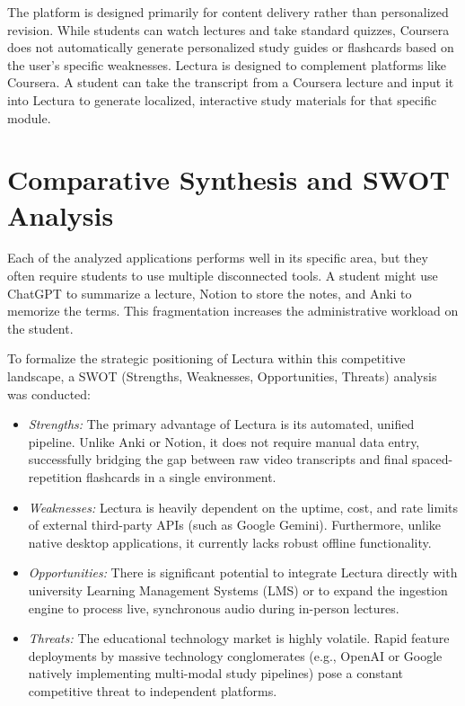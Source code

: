 The platform is designed primarily for content delivery rather than personalized revision. While students can watch lectures and take standard quizzes, Coursera does not automatically generate personalized study guides or flashcards based on the user's specific weaknesses. Lectura is designed to complement platforms like Coursera. A student can take the transcript from a Coursera lecture and input it into Lectura to generate localized, interactive study materials for that specific module.

\section{Comparative Synthesis and SWOT Analysis}
Each of the analyzed applications performs well in its specific area, but they often require students to use multiple disconnected tools. A student might use ChatGPT to summarize a lecture, Notion to store the notes, and Anki to memorize the terms. This fragmentation increases the administrative workload on the student.

To formalize the strategic positioning of Lectura within this competitive landscape, a SWOT (Strengths, Weaknesses, Opportunities, Threats) analysis was conducted:

\begin{itemize}[label=\textendash]
    \item \textit{Strengths:} The primary advantage of Lectura is its automated, unified pipeline. Unlike Anki or Notion, it does not require manual data entry, successfully bridging the gap between raw video transcripts and final spaced-repetition flashcards in a single environment.
    \item \textit{Weaknesses:} Lectura is heavily dependent on the uptime, cost, and rate limits of external third-party APIs (such as Google Gemini). Furthermore, unlike native desktop applications, it currently lacks robust offline functionality.
    \item \textit{Opportunities:} There is significant potential to integrate Lectura directly with university Learning Management Systems (LMS) or to expand the ingestion engine to process live, synchronous audio during in-person lectures.
    \item \textit{Threats:} The educational technology market is highly volatile. Rapid feature deployments by massive technology conglomerates (e.g., OpenAI or Google natively implementing multi-modal study pipelines) pose a constant competitive threat to independent platforms.
\end{itemize}

